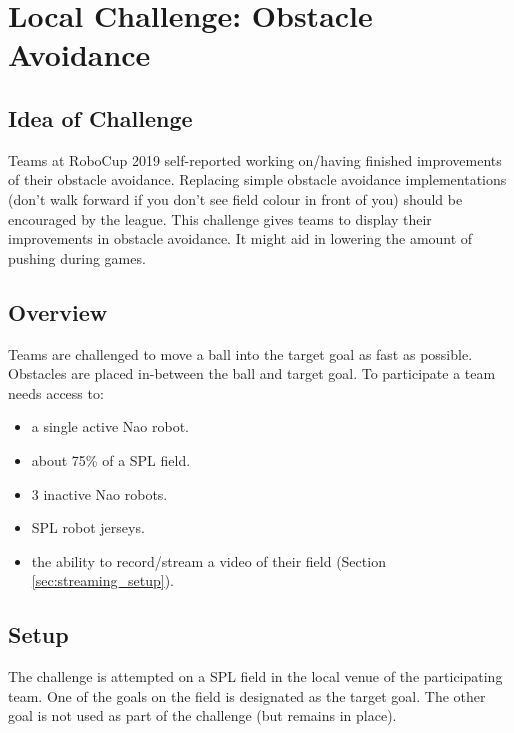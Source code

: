 \section{Local Challenge: Obstacle Avoidance}
\label{sec:ObstacleAvoidance}


\subsection{Idea of Challenge}

Teams at RoboCup 2019 self-reported working on/having finished improvements of their obstacle avoidance. Replacing simple obstacle avoidance implementations (don't walk forward if you don't see field colour in front of you) should be encouraged by the league. This challenge gives teams to display their improvements in obstacle avoidance. It might aid in lowering the amount of pushing during games.

\subsection{Overview}

Teams are challenged to move a ball into the target goal as fast as possible. Obstacles are placed in-between the ball and target goal. To participate a team needs access to:

\begin{itemize}
	\item a single active Nao robot.
	\item about 75\% of a SPL field.
	\item 3 inactive Nao robots.
	\item SPL robot jerseys.
	\item the ability to record/stream a video of their field (\cf Section \ref{sec:streaming_setup}).
\end{itemize}


\subsection{Setup}

The challenge is attempted on a SPL field in the local venue of the participating team. One of the goals on the field is designated as the target goal. The other goal is not used as part of the challenge (but remains in place).

